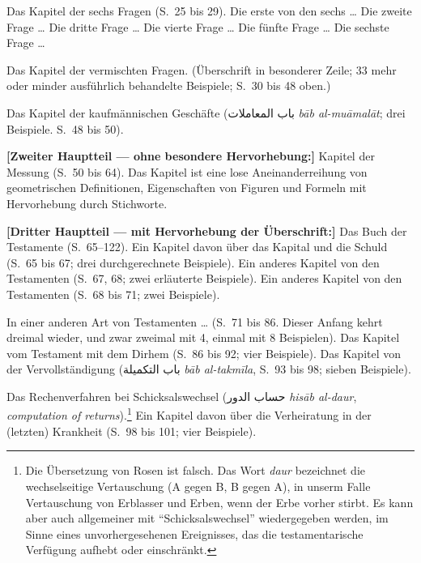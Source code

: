 \documentclass[11pt,a4paper]{article}
\newcommand{\RL}[1]{\beginR#1\endR}
\newcommand{\ar}[1]{{\arabicfont\RL{#1}}}
\newcommand{\enquote}[1]{``#1''}
\begin{document}
Das Kapitel der sechs Fragen (S.\ 25 bis 29). Die erste von den sechs \ldots{} Die zweite Frage \ldots{} Die dritte Frage \ldots{} Die vierte Frage \ldots{} Die f\"unfte Frage \ldots{} Die sechste Frage \ldots{}

Das Kapitel der vermischten Fragen. (\"Uberschrift in besonderer Zeile; 33 mehr oder minder ausf\"uhrlich behandelte Beispiele; S.\ 30 bis 48 oben.)

Das Kapitel der kaufm\"annischen Gesch\"afte (\ar{باب المعاملات} \textit{b\=ab al-mu\=amal\=at}; drei Beispiele. S.\ 48 bis 50).

\textbf{[Zweiter Hauptteil --- ohne besondere Hervorhebung:]} Kapitel der Messung (S.\ 50 bis 64). Das Kapitel ist eine lose Aneinanderreihung von geometrischen Definitionen, Eigenschaften von Figuren und Formeln mit Hervorhebung durch Stichworte.

\textbf{[Dritter Hauptteil --- mit Hervorhebung der \"Uberschrift:]} Das Buch der Testamente (S.\ 65--122). Ein Kapitel davon \"uber das Kapital und die Schuld (S.\ 65 bis 67; drei durchgerechnete Beispiele). Ein anderes Kapitel von den Testamenten (S.\ 67, 68; zwei erl\"auterte Beispiele). Ein anderes Kapitel von den Testamenten (S.\ 68 bis 71; zwei Beispiele).

In einer anderen Art von Testamenten \ldots{} (S.\ 71 bis 86. Dieser Anfang kehrt dreimal wieder, und zwar zweimal mit 4, einmal mit 8 Beispielen). Das Kapitel vom Testament mit dem Dirhem (S.\ 86 bis 92; vier Beispiele). Das Kapitel von der Vervollst\"andigung (\ar{باب التكميلة} \textit{b\=ab al-takm\={i}la}, S.\ 93 bis 98; sieben Beispiele).

Das Rechenverfahren bei Schicksalswechsel (\ar{حساب الدور} \textit{his\=ab al-daur}, \textit{computation of returns}).\footnote{Die \"Ubersetzung von Rosen ist falsch. Das Wort \textit{daur} bezeichnet die wechselseitige Vertauschung (A gegen B, B gegen A), in unserm Falle Vertauschung von Erblasser und Erben, wenn der Erbe vorher stirbt. Es kann aber auch allgemeiner mit \enquote{Schicksalswechsel} wiedergegeben werden, im Sinne eines unvorhergesehenen Ereignisses, das die testamentarische Verf\"ugung aufhebt oder einschr\"ankt.} Ein Kapitel davon \"uber die Verheiratung in der (letzten) Krankheit (S.\ 98 bis 101; vier Beispiele).
\end{document}
